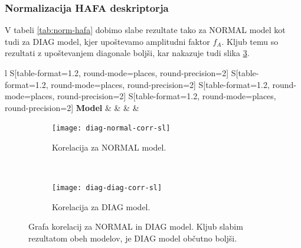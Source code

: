 \subsubsection{Normalizacija HAFA deskriptorja}
V tabeli \ref{tab:norm-hafa} dobimo slabe rezultate tako za NORMAL model kot tudi za DIAG model, kjer upoštevamo amplitudni faktor $f_A$. Kljub temu so rezultati z upoštevanjem diagonale boljši, kar nakazuje tudi slika \ref{fig:corr-diag}.

\begin{table}[!htbp]
	\centering
	\begin{tabular}{l S[table-format=1.2, round-mode=places, round-precision=2] S[table-format=1.2, round-mode=places, round-precision=2] S[table-format=1.2, round-mode=places, round-precision=2] S[table-format=1.2, round-mode=places, round-precision=2]}
		\toprule
		\textbf{Model} &  &  &  &  \\
		\midrule
		\bottomrule
	\end{tabular}
	\caption[Evaluacijske metrike pri primerjavi modelov NORMAL in DIAG]{Evaluacijske metrike pri primerjavi modelov NORMAL in DIAG, kjer upoštevamo amplitudni faktor $f_A$. }
	\label{tab:norm-hafa}
\end{table}

\begin{figure}[!htb]
	\centering
	\begin{subfigure}[t]{0.45\columnwidth}
		\texttt{[image: diag-normal-corr-sl]}
		\caption{Korelacija za NORMAL model.}
		\label{fig:corr-diag-normal}
	\end{subfigure}
	~
	\begin{subfigure}[t]{0.45\columnwidth}
		\texttt{[image: diag-diag-corr-sl]}
		\caption{Korelacija za DIAG model.}
		\label{fig:corr-diag-diag}
	\end{subfigure}
	\caption[]{Grafa korelacij za NORMAL in DIAG model. Kljub slabim rezultatom obeh modelov, je DIAG model občutno boljši.}
	\label{fig:corr-diag}
\end{figure}


